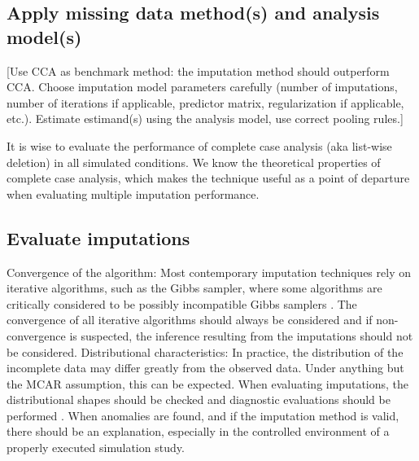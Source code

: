 \documentclass[bimj,fleqn]{w-art}
\begin{document}

\subsection{Apply missing data method(s) and analysis model(s)}


[Use CCA as benchmark method: the imputation method should outperform CCA. Choose imputation model parameters carefully (number of imputations, number of iterations if applicable, predictor matrix, regularization if applicable, etc.). Estimate estimand(s) using the analysis model, use correct pooling rules.]

It is wise to evaluate the performance of complete case analysis (aka list-wise deletion) in all simulated conditions. We know the theoretical properties of complete case analysis, which makes the technique useful as a point of departure when evaluating multiple imputation performance. 


\subsection{Evaluate imputations}


Convergence of the algorithm: Most contemporary imputation techniques rely on iterative algorithms, such as the Gibbs sampler, where some algorithms are critically considered to be possibly incompatible Gibbs samplers \citep[PIGS,][]{li2012imputing}. The convergence of all iterative algorithms should always be considered and if non-convergence is suspected, the inference resulting from the imputations should not be considered. 
Distributional characteristics: In practice, the distribution of the incomplete data may differ greatly from the observed data. Under anything but the MCAR assumption, this can be expected. When evaluating imputations, the distributional shapes should be checked and diagnostic evaluations should be performed \citep[see][for a detailed overview of diagnostic evaluation for multivariate imputations]{abayomi2008diagnostics}. When anomalies are found, and if the imputation method is valid, there should be an explanation, especially in the controlled environment of a properly executed simulation study. 
\end{document}
